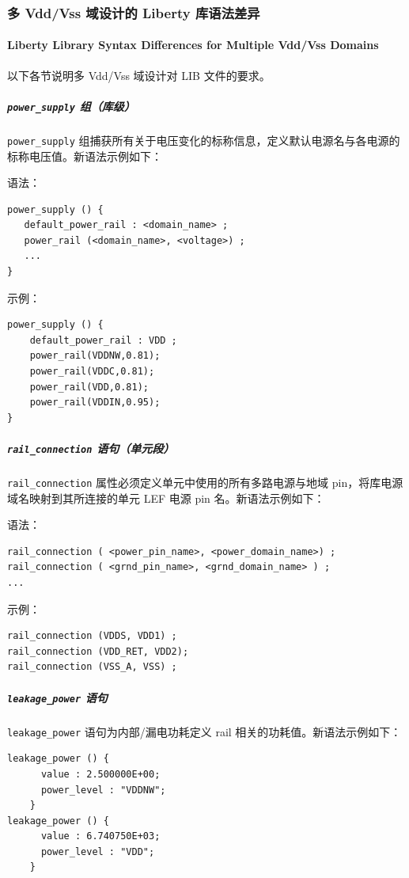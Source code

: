 \subsubsection{多 Vdd/Vss 域设计的 Liberty 库语法差异}
\paragraph*{Liberty Library Syntax Differences for Multiple Vdd/Vss Domains}

以下各节说明多 Vdd/Vss 域设计对 LIB 文件的要求。

\subparagraph{\texttt{power\_supply} 组（库级）}
\texttt{power\_supply} 组捕获所有关于电压变化的标称信息，定义默认电源名与各电源的标称电压值。新语法示例如下：

语法：
\begin{lstlisting}
power_supply () {
   default_power_rail : <domain_name> ;
   power_rail (<domain_name>, <voltage>) ;
   ...
}
\end{lstlisting}

示例：
\begin{lstlisting}
power_supply () {
    default_power_rail : VDD ;
    power_rail(VDDNW,0.81);
    power_rail(VDDC,0.81);
    power_rail(VDD,0.81);
    power_rail(VDDIN,0.95);
}
\end{lstlisting}

\subparagraph{\texttt{rail\_connection} 语句（单元段）}
\texttt{rail\_connection} 属性必须定义单元中使用的所有多路电源与地域 pin，将库电源域名映射到其所连接的单元 LEF 电源 pin 名。新语法示例如下：

语法：
\begin{lstlisting}
rail_connection ( <power_pin_name>, <power_domain_name>) ;
rail_connection ( <grnd_pin_name>, <grnd_domain_name> ) ;
...
\end{lstlisting}

示例：
\begin{lstlisting}
rail_connection (VDDS, VDD1) ;
rail_connection (VDD_RET, VDD2);
rail_connection (VSS_A, VSS) ;
\end{lstlisting}

\subparagraph{\texttt{leakage\_power} 语句}
\texttt{leakage\_power} 语句为内部/漏电功耗定义 rail 相关的功耗值。新语法示例如下：
\begin{lstlisting}
leakage_power () {
      value : 2.500000E+00;
      power_level : "VDDNW";
    }
leakage_power () {
      value : 6.740750E+03;
      power_level : "VDD";
    }
\end{lstlisting}

